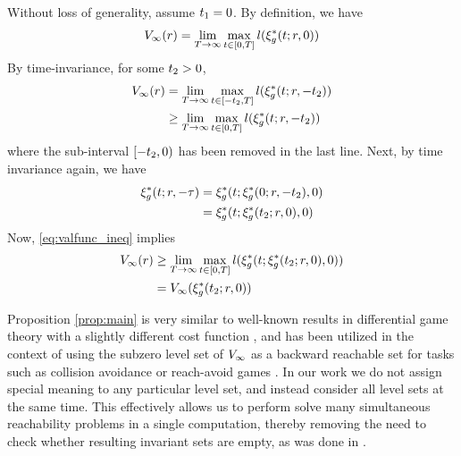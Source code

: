 \begin{IEEEproof}
Without loss of generality, assume $t_1=0$. By definition, we have
\begin{equation}
\begin{aligned}
V_\infty(r) & = \lim_{T\rightarrow\infty}\max_{t \in [0, T]} l(\xi_g^*(t; r, 0))\\
\end{aligned}
\end{equation}
By time-invariance, for some $t_2 > 0$,
\begin{equation}
\label{eq:valfunc_ineq}
  \begin{aligned}
\valfunc_\infty(\rstate) &= \lim_{\thor\rightarrow\infty}\max_{\tvar \in [-\tvar_2, \thor]} \errfunc(\rtraj^*(\tvar; \rstate, -\tvar_2)) \\
&\ge \lim_{\thor\rightarrow\infty}\max_{\tvar \in [0, \thor]} \errfunc(\rtraj^*(\tvar; \rstate, -\tvar_2)) 
  \end{aligned}
\end{equation}  
\noindent where the sub-interval $[-t_2, 0)$ has been removed in the last line. Next, by time invariance again, we  have
\begin{equation}
\begin{aligned}
\xi_g^*(t; r, -\tau) &= \xi_g^*(t; \xi_g^*(0; r, -t_2), 0) \\
&= \xi_g^*(t; \xi_g^*(t_2; r, 0), 0)
\end{aligned}
\end{equation}
Now, \eqref{eq:valfunc_ineq} implies
\begin{equation}
\begin{aligned}
V_\infty(r) &\ge \lim_{T\rightarrow\infty}\max_{t \in [0, T]} l(\xi_g^*(t; \xi_g^*(t_2; r, 0), 0)) \\
&= V_\infty(\xi_g^*(t_2; r, 0))
\end{aligned}
\end{equation} 
\end{IEEEproof} 
 \begin{rem} 
   Proposition \ref{prop:main} is very similar to well-known results in differential game theory with a slightly different cost function \cite{Akametalu2014}, and has been utilized in the context of using the subzero level set of $V_\infty$ as a backward reachable set for tasks such as collision avoidance or reach-avoid games \cite{Mitchell05}. In our work we do not assign special meaning to any particular level set, and instead consider all level sets at the same time. This effectively allows us to perform solve many simultaneous reachability problems in a single computation, thereby removing the need to check whether resulting invariant sets are empty, as was done in \cite{Bansal2017}.
 \end{rem}